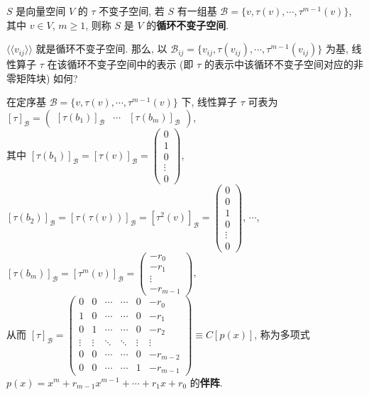 \documentclass{note}
\begin{document}
\begin{df}[循环不变子空间]
    $S$ 是向量空间 $V$ 的 $\tau$ 不变子空间, 若 $S$ 有一组基 $\mathcal{B}=\{v,\tau(v),\cdots,\tau^{m-1}(v)\}$, 其中 $v\in V$, $m\geq 1$, 则称 $S$ 是 $V$ 的\textbf{循环不变子空间}.
\end{df}

$\langle\langle v_{ij}\rangle\rangle$ 就是循环不变子空间. 那么, 以 $\mathcal{B}_{ij}=\{v_{ij},\tau(v_{ij}),\cdots,\tau^{m-1}(v_{ij})\}$ 为基, 线性算子 $\tau$ 在该循环不变子空间中的表示 (即 $\tau$ 的表示中该循环不变子空间对应的非零矩阵块) 如何?

\begin{df}[伴阵]
    在定序基 $\mathcal{B}=\{v,\tau(v),\cdots,\tau^{m-1}(v)\}$ 下, 线性算子 $\tau$ 可表为 $[\tau]_{\mathcal{B}}=\begin{pmatrix}
            [\tau(b_1)]_{\mathcal{B}}&\cdots&[\tau(b_m)]_{\mathcal{B}}
    \end{pmatrix}$,\\
    其中 $[\tau(b_1)]_{\mathcal{B}}=[\tau(v)]_{\mathcal{B}}=\begin{pmatrix}
        0\\
        1\\
        0\\
        \vdots\\
        0
    \end{pmatrix}$, $[\tau(b_2)]_{\mathcal{B}}=[\tau(\tau(v))]_{\mathcal{B}}=[\tau^2(v)]_{\mathcal{B}}=\begin{pmatrix}
        0\\
        0\\
        1\\
        0\\
        \vdots\\
        0
    \end{pmatrix}$, $\cdots$, $[\tau(b_m)]_{\mathcal{B}}=[\tau^m(v)]_{\mathcal{B}}=\begin{pmatrix}
        -r_0\\
        -r_1\\
        \vdots\\
        -r_{m-1}
    \end{pmatrix}$,\\
    从而 $[\tau]_{\mathcal{B}}=\begin{pmatrix}
        0&0&\cdots&\cdots&0&-r_0\\
        1&0&\cdots&\cdots&0&-r_1\\
        0&1&\cdots&\cdots&0&-r_2\\
        \vdots&\vdots&\ddots&\ddots&\vdots&\vdots\\
        0&0&\cdots&\cdots&0&-r_{m-2}\\
        0&0&\cdots&\cdots&1&-r_{m-1}
    \end{pmatrix}\equiv C[p(x)]$, 称为多项式 $p(x)=x^m+r_{m-1}x^{m-1}+\cdots+r_1x+r_0$ 的\textbf{伴阵}.
\end{df}
\end{document}
